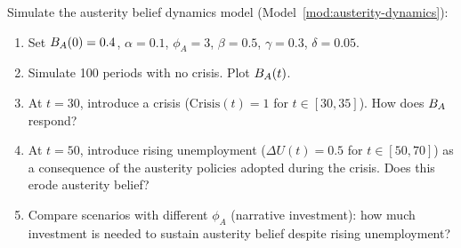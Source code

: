 \begin{exercise}[Computational]
Simulate the austerity belief dynamics model (Model~\ref{mod:austerity-dynamics}):
\begin{enumerate}[nosep]
  \item Set $B_{A}(0) = 0.4$, $\alpha = 0.1$, $\phi_A = 3$, $\beta = 0.5$, $\gamma = 0.3$, $\delta = 0.05$.
  \item Simulate 100 periods with no crisis. Plot $B_{A}(t)$.
  \item At $t = 30$, introduce a crisis ($\text{Crisis}(t) = 1$ for $t \in [30, 35]$). How does $B_{A}$ respond?
  \item At $t = 50$, introduce rising unemployment ($\Delta U(t) = 0.5$ for $t \in [50, 70]$) as a consequence of the austerity policies adopted during the crisis. Does this erode austerity belief?
  \item Compare scenarios with different $\phi_A$ (narrative investment): how much investment is needed to sustain austerity belief despite rising unemployment?
\end{enumerate}
\end{exercise}

